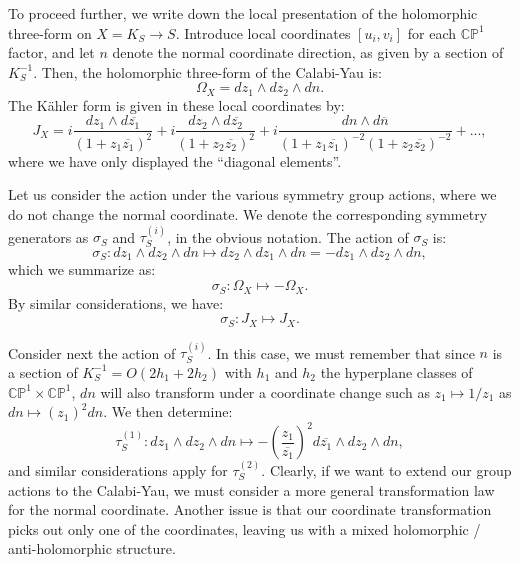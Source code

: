 \documentclass[12pt]{article}%
\numberwithin{equation}{section}
\renewcommand{\(}{\left(}
\renewcommand{\)}{\right)}
\renewcommand{\[}{\left[}
\renewcommand{\]}{\right]}
\begin{document}
To proceed further, we write down the local presentation of the holomorphic
three-form on $X=K_{S}\rightarrow S$. Introduce local coordinates
$[u_{i},v_{i}]$ for each $\mathbb{CP}^{1}$ factor, and let $n$ denote the
normal coordinate direction, as given by a section of $K_{S}^{-1}$. Then, the
holomorphic three-form of the Calabi-Yau is:%
\begin{equation}
\Omega_{X}=dz_{1}\wedge dz_{2}\wedge dn.
\end{equation}
The K\"ahler form is given in these local coordinates by:%
\begin{equation}
J_{X}=i\frac{dz_{1}\wedge d\overline{z_{1}}}{(1+z_{1}\overline{z_{1}})^{2}%
}+i\frac{dz_{2}\wedge d\overline{z_{2}}}{(1+z_{2}\overline{z_{2}})^{2}}%
+i\frac{dn\wedge d\overline{n}}{(1+z_{1}\overline{z_{1}})^{-2}(1+z_{2}%
\overline{z_{2}})^{-2}}+...,\label{JKahler}%
\end{equation}
where we have only displayed the \textquotedblleft diagonal
elements\textquotedblright.

Let us consider the action under the various symmetry group actions, where we
do not change the normal coordinate. We denote the corresponding symmetry
generators as $\sigma_{S}$ and $\tau_{S}^{(i)}$, in the obvious notation. The
action of $\sigma_{S}$ is:
\begin{equation}
\sigma_{S}:dz_{1}\wedge dz_{2}\wedge dn\mapsto dz_{2}\wedge dz_{1}\wedge
dn=-dz_{1}\wedge dz_{2}\wedge dn,
\end{equation}
which we summarize as:%
\begin{equation}
\sigma_{S}:\Omega_{X}\mapsto-\Omega_{X}.
\end{equation}
By similar considerations, we have:%
\begin{equation}
\sigma_{S}:J_{X}\mapsto J_{X}.
\end{equation}


Consider next the action of $\tau_{S}^{(i)}$. In this case, we must remember
that since $n$ is a section of $K_{S}^{-1}=O(2h_{1}+2h_{2})$ with $h_{1}$ and
$h_{2}$ the hyperplane classes of $\mathbb{CP}^{1}\times\mathbb{CP}^{1}$, $dn$
will also transform under a coordinate change such as $z_{1}\mapsto1/z_{1}$ as
$dn\mapsto(z_{1})^{2}dn$. We then determine:%
\begin{equation}
\tau_{S}^{(1)}:dz_{1}\wedge dz_{2}\wedge dn\mapsto-\left(  \frac{z_{1}%
}{\overline{z_{1}}}\right)  ^{2}d\overline{z_{1}}\wedge dz_{2}\wedge dn,
\end{equation}
and similar considerations apply for $\tau_{S}^{(2)}$. Clearly, if we want to
extend our group actions to the Calabi-Yau, we must consider a more general
transformation law for the normal coordinate. Another issue is that our
coordinate transformation picks out only one of the coordinates, leaving us
with a mixed holomorphic / anti-holomorphic structure.
\end{document}
